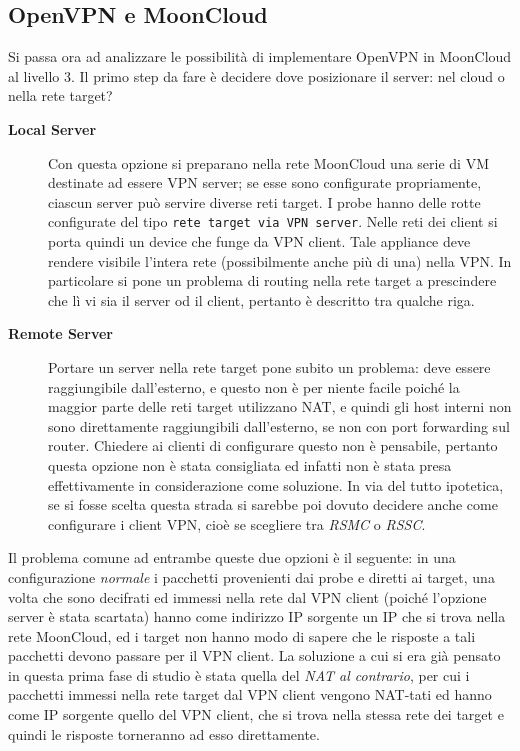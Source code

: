 \subsection{OpenVPN e MoonCloud}
Si passa ora ad analizzare le possibilità di implementare OpenVPN in MoonCloud al livello 3. Il primo step
da fare è decidere dove posizionare il server: nel cloud o nella rete target?
\begin{description}
  \item[\textbf{Local Server}]Con questa opzione si preparano nella rete MoonCloud una serie
  di VM destinate ad essere VPN server; se esse sono configurate propriamente, ciascun server
  può servire diverse reti target. I probe
  hanno delle rotte configurate del tipo \texttt{rete target via VPN server}.
  Nelle reti dei client si porta quindi un device che funge da VPN client.
  Tale appliance deve rendere visibile l'intera rete (possibilmente anche più di una) nella VPN. In
  particolare si pone un problema di routing nella rete target a prescindere che lì vi sia
  il server od il client, pertanto è descritto tra qualche riga.
  \item[\textbf{Remote Server}]Portare un server nella rete target pone subito un problema: deve
  essere raggiungibile dall'esterno, e questo non è per niente facile poiché la maggior parte
  delle reti target utilizzano NAT, e quindi gli host interni non sono direttamente raggiungibili
  dall'esterno, se non con port forwarding sul router. Chiedere ai clienti di configurare
  questo non è pensabile, pertanto questa opzione non è stata consigliata ed infatti
  non è stata presa effettivamente in considerazione come soluzione.
  In via del tutto ipotetica, se si fosse scelta questa strada si sarebbe poi
  dovuto decidere anche come configurare i client VPN, cioè se scegliere tra \textit{RSMC}
  o \textit{RSSC}.
\end{description}
Il problema comune ad entrambe queste due opzioni è il seguente: in una configurazione
\textit{normale} i pacchetti provenienti dai probe e diretti ai target, una volta che
sono decifrati ed immessi nella rete dal VPN client (poiché l'opzione server
è stata scartata) hanno come indirizzo IP sorgente un IP che si trova nella rete MoonCloud,
ed i target non hanno modo di sapere che le risposte a tali pacchetti devono passare
per il VPN client. La soluzione a cui si era già pensato in questa prima fase di studio
è stata quella del \textit{NAT al contrario}, per cui i pacchetti immessi nella rete
target dal VPN client vengono NAT-tati ed hanno come IP sorgente quello del VPN
client, che si trova nella stessa rete dei target e quindi le risposte torneranno
ad esso direttamente.

